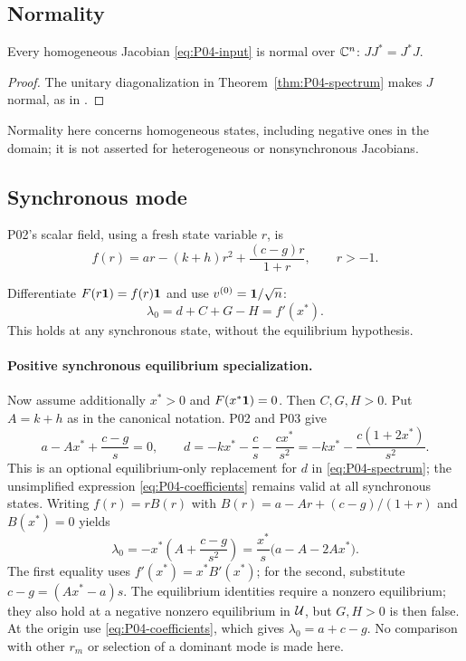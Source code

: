 \subsection{Normality}
\label{slot:P04-2}

\begin{proposition}[Normality]
\label{prop:P04-normality}
Every homogeneous Jacobian \eqref{eq:P04-input} is normal over
$\mathbb{C}^n$: $JJ^*=J^*J$.
\end{proposition}
\begin{proof}
The unitary diagonalization in Theorem~\ref{thm:P04-spectrum}
makes $J$ normal, as in \cite[\S3.1]{Gray2006}.
\end{proof}

Normality here concerns homogeneous states, including negative ones in the domain; it is not asserted for heterogeneous or nonsynchronous Jacobians.

\subsection{Synchronous mode}

P02's scalar field, using a fresh state variable $r$, is
\[
 f(r)=ar-(k+h)r^2+\frac{(c-g)r}{1+r},\qquad r>-1.
\]

Differentiate $F(r\mathbf{1})=f(r)\mathbf{1}$ and use $v^{(0)}=\mathbf{1}/\sqrt n$:
\begin{equation}
 \boxed{\lambda_0=d+C+G-H=f'(x^*).}
 \label{eq:P04-synchronous-derivative}
\end{equation}
This holds at any synchronous state, without the equilibrium hypothesis.

\paragraph{Positive synchronous equilibrium specialization.}
Now assume additionally $x^*>0$ and $F(x^*\mathbf{1})=0$.
Then $C,G,H>0$. Put $A=k+h$ as in the canonical notation.
P02 and P03 give
\[
 a-Ax^*+\frac{c-g}{s}=0,\qquad
 d=-kx^*-\frac{c}{s}-\frac{cx^*}{s^2}
   =-kx^*-\frac{c(1+2x^*)}{s^2}.
\]
This is an optional equilibrium-only replacement for $d$ in
\eqref{eq:P04-spectrum}; the unsimplified expression
\eqref{eq:P04-coefficients} remains valid at all synchronous states.
Writing $f(r)=rB(r)$ with
$B(r)=a-Ar+(c-g)/(1+r)$ and $B(x^*)=0$ yields
\begin{equation}
 \boxed{\lambda_0=-x^*\left(A+\frac{c-g}{s^2}\right)
          =\frac{x^*}{s}\bigl(a-A-2Ax^*\bigr).}
 \label{eq:P04-equilibrium-zero-mode}
\end{equation}
The first equality uses $f'(x^*)=x^*B'(x^*)$; for the second,
substitute $c-g=(Ax^*-a)s$.
The equilibrium identities require a nonzero equilibrium; they also
hold at a negative nonzero equilibrium in $\mathcal{U}$, but $G,H>0$
is then false. At the origin use \eqref{eq:P04-coefficients}, which
gives $\lambda_0=a+c-g$. No comparison with other $r_m$ or selection
of a dominant mode is made here.

